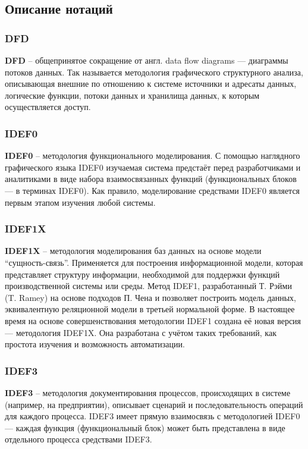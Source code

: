 \documentclass[a4paper,14pt]{extarticle}
\begin{document}
\subsection{Описание нотаций}
\subsubsection{DFD}
\textbf{DFD} – общепринятое сокращение от англ. data flow diagrams — диаграммы потоков
данных. Так называется методология графического структурного анализа,
описывающая внешние по отношению к системе источники и адресаты данных,
логические функции, потоки данных и хранилища данных, к которым осуществляется
доступ.

\subsubsection{IDEF0}
\textbf{IDEF0} – методология функционального моделирования. С помощью наглядного
графического языка IDEF0 изучаемая система предстаёт перед разработчиками и
аналитиками в виде набора взаимосвязанных функций (функциональных блоков — в
терминах IDEF0). Как правило, моделирование средствами IDEF0 является первым
этапом изучения любой системы.

\subsubsection{IDEF1X}
\textbf{IDEF1X} – методология моделирования баз данных на основе модели \\\enquote{сущность-связь}.
Применяется для построения информационной модели, которая представляет структуру
информации, необходимой для поддержки функций производственной системы или
среды. Метод IDEF1, разработанный Т. Рэйми (T. Ramey) на основе подходов П. Чена
и позволяет построить модель данных, эквивалентную реляционной модели в третьей
нормальной форме. В настоящее время на основе совершенствования методологии
IDEF1 создана её новая версия — методология IDEF1X. Она разработана с учётом
таких требований, как простота изучения и возможность автоматизации.

\subsubsection{IDEF3}
\textbf{IDEF3} – методология документирования процессов, происходящих в системе
(например, на предприятии), описывает сценарий и последовательность операций для
каждого процесса. IDEF3 имеет прямую взаимосвязь с методологией IDEF0 — каждая
функция (функциональный блок) может быть представлена в виде отдельного процесса
средствами IDEF3.
\end{document}
